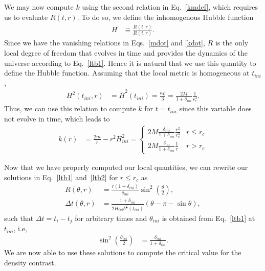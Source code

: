 \documentclass[a4paper,11pt]{article}
\begin{document}
We may now compute $k$ using the second relation in Eq.~\eqref{kmdef}, which requires us
to evaluate $\dot{R}(t, r)$. To do so, we define the inhomogenous Hubble function
\begin{align}
	\label{hdefltb}
	H & \equiv \frac{\dot{R}(t, r)}{R(t, r)}
	.\end{align}
Since we have the vanishing relations in Eqs.~\eqref{mdot} and \eqref{kdot}, $R$ is the
only local degree of freedom that evolves in time and provides the dynamics of the
universe according to Eq.~\eqref{ltb1}. Hence it is natural that we use this quantity to
define the Hubble function.  Assuming that the local metric is homogeneous at $t_{ini}$,
\begin{align}
	\label{hinicond}
	H^2(t_{ini}, r) & = \bar{H}^2(t_{ini}) = \frac{ \kappa \bar{\rho}}{3} = \frac{2 M}{1 +  \delta_{ini}} \frac{1}{r_c^3}
	.\end{align}
Thus, we can use this relation to compute $k$ for $t = t_{ini}$ since this variable does
not evolve in time, which leads to
\begin{align}
	k(r) & = \frac{2m}{r} - r^2H^2_{ini}= \left\{\begin{array}{ll}
		                                             2M\frac{\delta_{ini}}{1+\delta_{ini}}\frac{r^2}{r_\mathrm{c}^3} & r \leq r_c \\
		                                             2M\frac{\delta_\mathrm{ini}}{1+\delta_{ini}}\frac{1}{r}         & r > r_c
	                                             \end{array}\right.
\end{align}

Now that we have properly computed our local quantities, we can rewrite our solutions in
Eq.~\eqref{ltb1} and~\eqref{ltb2} for $r\leq r_c$ as
\begin{align}
	\label{ltb3}
	R(\theta, r)        & = \frac{r (1+\delta_{ini})}{\delta_{ini}}\sin^2\left(\frac{\theta}{2}\right),                             \\
	\label{ltb4}
	\Delta t(\theta,r ) & = \frac{1 + \delta_{ini}}{2H_{ini}\delta^{\frac{3}{2}}(t_{ini})}\left(\theta - \pi - \sin \theta \right),
\end{align}
such that $\Delta t = t_i - t_j$ for arbitrary times and $\theta_{ini}$ is obtained from
Eq.~\eqref{ltb1} at $t_{ini}$, i.e,
\begin{align}
	\label{sintheta}
	\sin^2\left(\frac{\theta_{ini}}{2}\right) & = \frac{\delta_{ini}}{1 + \delta_{ini}}
	.\end{align}
We are now able to use these solutions to compute the critical value for the density
contrast.
\end{document}
